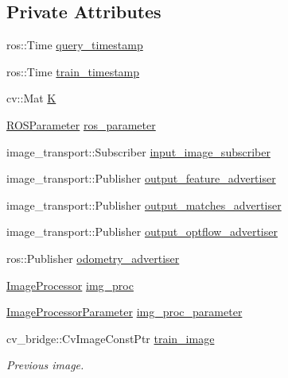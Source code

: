 \subsection*{\-Private \-Attributes}
\begin{DoxyCompactItemize}
\item 
ros\-::\-Time \hyperlink{classLRM_1_1MonoOdometer_ae201ba1988badf708c046e1b29b70ab1}{query\-\_\-timestamp}
\item 
ros\-::\-Time \hyperlink{classLRM_1_1MonoOdometer_a7024b12b516c41771d59046471ea7319}{train\-\_\-timestamp}
\item 
cv\-::\-Mat \hyperlink{classLRM_1_1MonoOdometer_a7f874bb9b174d7a38085782377d5f195}{\-K}
\item 
\hyperlink{classLRM_1_1ROSParameter}{\-R\-O\-S\-Parameter} \hyperlink{classLRM_1_1MonoOdometer_a7667abb4e8d035e25811c63e6af42ae3}{ros\-\_\-parameter}
\item 
image\-\_\-transport\-::\-Subscriber \hyperlink{classLRM_1_1MonoOdometer_ad191c12993c8e8ee9200f71aec07057c}{input\-\_\-image\-\_\-subscriber}
\item 
image\-\_\-transport\-::\-Publisher \hyperlink{classLRM_1_1MonoOdometer_abcc8b0e66d3629d66b74e8d857adea9e}{output\-\_\-feature\-\_\-advertiser}
\item 
image\-\_\-transport\-::\-Publisher \hyperlink{classLRM_1_1MonoOdometer_ab3e372106292ea873dc5428e1b3d0026}{output\-\_\-matches\-\_\-advertiser}
\item 
image\-\_\-transport\-::\-Publisher \hyperlink{classLRM_1_1MonoOdometer_a2f9dcb6ceed7b4b85e0df512fc297105}{output\-\_\-optflow\-\_\-advertiser}
\item 
ros\-::\-Publisher \hyperlink{classLRM_1_1MonoOdometer_a113a9a4905bb7c9f19df55610802ffec}{odometry\-\_\-advertiser}
\item 
\hyperlink{classLRM_1_1ImageProcessor}{\-Image\-Processor} \hyperlink{classLRM_1_1MonoOdometer_a49bef96a5413beea489f87dbb16eaf70}{img\-\_\-proc}
\item 
\hyperlink{classLRM_1_1ImageProcessorParameter}{\-Image\-Processor\-Parameter} \hyperlink{classLRM_1_1MonoOdometer_a1bf24a1abdef05b79b54813058cad4a7}{img\-\_\-proc\-\_\-parameter}
\item 
cv\-\_\-bridge\-::\-Cv\-Image\-Const\-Ptr \hyperlink{classLRM_1_1MonoOdometer_a91ee6e52006559ba0f769a2ccc06fa64}{train\-\_\-image}
\begin{DoxyCompactList}\small\item\em \-Previous image. \end{DoxyCompactList}\item 

\end{DoxyCompactItemize}
